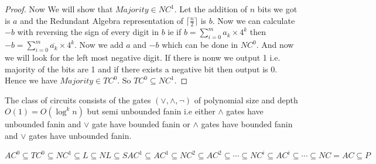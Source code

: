 \begin{proof}
	
	
	Now We will show that $Majority\in NC^1$. Let the addition of $n$ bits we got is $a$ and the Redundant Algebra representation of $\lceil\frac{n}2\rceil$ is $b$. Now we can calculate $-b$ with reversing the sign of every digit in $b$ ie if $b=\sum\limits_{i=0}^{m}a_k\times 4^k$ then $-b=\sum\limits_{i=0}^m\overline{a_k}\times 4^k$. Now we add $a$ and $-b$ which can be done in $NC^0$. And now we will look for the left most negative digit. If there is nonw we output 1 i.e. majority of the bits are 1 and if there exists a negative bit then output is 0. Hence we have $Majority\in TC^0$. So $TC^0\subseteq NC^1$.
\end{proof}

\begin{definition}[$SAC^k$]
	The class of circuits consists of the gates $(\vee,\wedge,\neg)$  of polynomial size and depth $O(1)=O(\log^k n)$ but semi unbounded fanin i.e either $\wedge$ gates have unbounded fanin and $\vee$ gate have bounded fanin or $\wedge$ gates have bounded fanin and $\vee$ gates have unbounded fanin.
\end{definition}
\begin{theorem}
	$AC^0\subseteq TC^0\subseteq NC^1\subseteq L\subseteq NL\subseteq  SAC^1\subseteq AC^1\subseteq NC^2\subseteq AC^2\subseteq \cdots \subseteq NC^i\subseteq AC^i\subseteq \cdots \subseteq NC=AC\subseteq P$
\end{theorem}
